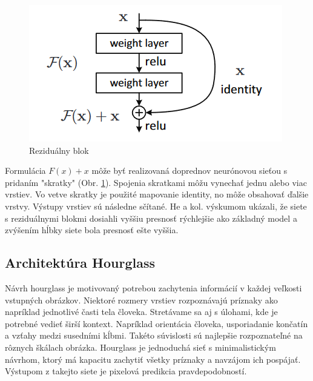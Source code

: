 \begin{figure}[H]
	\begin{center}
		\includegraphics[scale=0.7]{images/residual.png}
		\caption{Reziduálny blok \cite{DBLP:journals/corr/HeZRS15}}
		\label{img:residual}
	\end{center}
\end{figure}

Formulácia $F(x) + x$ môže byť realizovaná doprednov neurónovou sieťou s pridaním "skratky" (Obr. \ref{img:residual}). Spojenia skratkami môžu vynechať jednu alebo viac vrstiev. Vo vetve skratky je použité mapovanie identity, no môže obsahovať ďalšie vrstvy. Výstupy vrstiev sú následne sčítané. He a kol. výskumom ukázali, že siete s reziduálnymi blokmi dosiahli vyššiu presnosť rýchlejšie ako základný model a zvýšením hĺbky siete bola presnosť ešte vyššia.


\subsection{Architektúra Hourglass}\label{architecture_hourglass}

Návrh hourglass \cite{DBLP:journals/corr/NewellYD16} je motivovaný potrebou zachytenia informácií v každej veľkosti vstupných obrázkov. Niektoré rozmery vrstiev rozpoznávajú príznaky ako napríklad jednotlivé časti tela človeka. Stretávame sa aj s úlohami, kde je potrebné vedieť širší kontext. Napríklad orientácia človeka, usporiadanie končatín a vzťahy medzi susedními kĺbmi. Takéto súvislosti sú najlepšie rozpoznateľné na rôznych škálach obrázka. Hourglass je jednoduchá sieť s minimalistickým návrhom, ktorý má kapacitu zachytiť všetky príznaky a navzájom ich pospájať. Výstupom z takejto siete je pixelová predikcia pravdepodobností.

